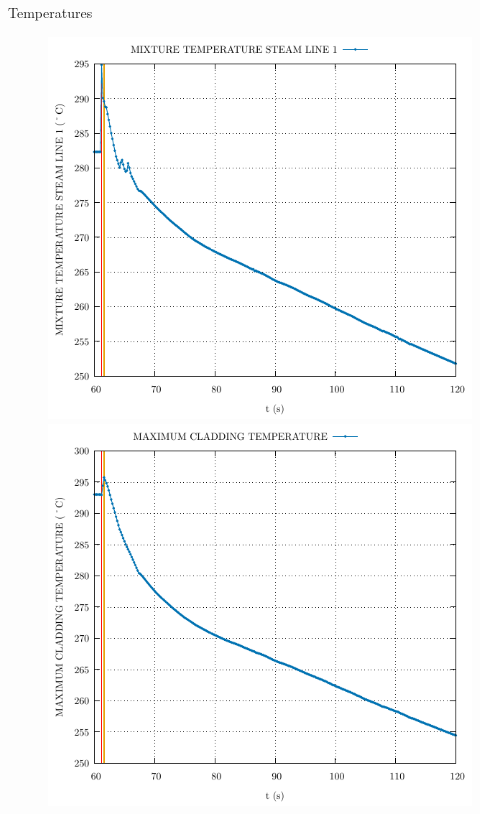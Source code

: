 \begin{frame}{Temperatures}
	\begin{figure}
		\centering
		\begin{minipage}{.5\textwidth}
			\centering
			\includegraphics[width=\linewidth]{./graphs/MIXTURE TEMPERATURE STEAM LINE 1.pdf}
		\end{minipage}%
		\begin{minipage}{.5\textwidth}
			\centering
			\includegraphics[width=\linewidth]{./graphs/MAXIMUM CLADDING TEMPERATURE.pdf}
		\end{minipage}
	\end{figure}
	
\end{frame}


